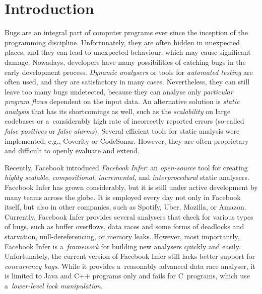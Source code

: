 

\chapter{Introduction}

Bugs are an integral part of computer programs ever since the inception of
the programming discipline. Unfortunately, they are often hidden in unexpected
places, and they can lead to unexpected behaviour, which may cause significant
damage. Nowadays, developers have many possibilities of catching bugs in the
early development process. \emph{Dynamic analysers} or tools for
\emph{automated testing} are often used, and they are satisfactory in many
cases. Nevertheless, they can still leave too many bugs undetected, because
they can analyse only \emph{particular program flows} dependent on the input
data. An alternative solution is \emph{static analysis} that has its
shortcomings as well, such as the \emph{scalability} on large codebases or
a~considerably high rate of incorrectly reported errors (so-called \emph{false
positives} or \emph{false alarms}). Several efficient tools for static analysis
were implemented, e.g., Coverity or CodeSonar. However, they are often
proprietary and difficult to openly evaluate and extend.

Recently, Facebook introduced \emph{Facebook Infer}: an \emph{open-source}
tool for creating \emph{highly scalable}, \emph{compositional},
\emph{incremental}, and \emph{interprocedural} static analysers. Facebook
Infer has grown considerably, but it is still under active development by many
teams across the globe. It is employed every day not only in Facebook itself,
but also in other companies, such as Spotify, Uber, Mozilla, or Amazon.
Currently, Facebook Infer provides several analysers that check for various
types of bugs, such as buffer overflows, data races and some forms of deadlocks
and starvation, null-dereferencing, or memory leaks. However, most importantly,
Facebook Infer is a~\emph{framework} for building new analysers quickly and
easily. Unfortunately, the current version of Facebook Infer still lacks better
support for \emph{concurrency bugs}. While it provides a~reasonably advanced
data race analyser, it is limited to Java and C++ programs only and fails for
C~programs, which use a~\emph{lower-level lock manipulation}.

